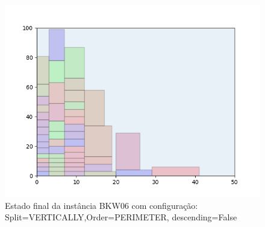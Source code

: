 \begin{figure}[H]
    \centering
    \caption[]{Estado final da instância BKW06 com configuração: Split=VERTICALLY,Order=PERIMETER, descending=False}
    \label{fig:bkw06-vertically-perimeter-false}
    \includegraphics[scale=0.5]{output/figures/bkw/bkw06/vertically/perimeter/false/00}
\end{figure}